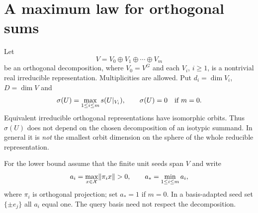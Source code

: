 \section{A maximum law for orthogonal sums}\label{sec:sum}
Let
\begin{equation}\label{eq:decomposition}
 V=V_0\oplus V_1\oplus\cdots\oplus V_m
\end{equation}
be an orthogonal decomposition, where $V_0=V^G$ and each $V_i$,
$i\ge1$, is a nontrivial real irreducible representation. Multiplicities
are allowed. Put $d_i=\dim V_i$, $D=\dim V$ and
\begin{equation}\label{eq:sigma}
 \sigma(U)=\max_{1\le i\le m}s(U|_{V_i}),
 \qquad \sigma(U)=0\quad\hbox{if }m=0.
\end{equation}
Equivalent irreducible orthogonal representations have isomorphic
orbits. Thus $\sigma(U)$ does not depend on the chosen decomposition
of an isotypic summand. In general it is \emph{not} the smallest
orbit dimension on the sphere of the whole reducible representation.

For the lower bound assume that the finite unit seeds span $V$ and
write
\begin{equation}\label{eq:seed-activation}
 a_i=\max_{x\in\mathcal X}\lVert\pi_i x\rVert>0,
 \qquad a_* =\min_{1\le i\le m}a_i,
\end{equation}
where $\pi_i$ is orthogonal projection; set $a_*=1$ if $m=0$.
In a basis-adapted seed set
$\{\pm e_j\}$ all $a_i$ equal one. The query basis need not respect
the decomposition.

